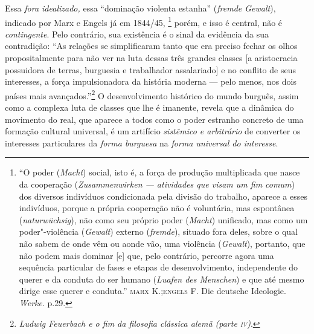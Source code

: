 Essa \emph{fora idealizado,} essa ``dominação violenta estanha''
(\emph{fremde Gewalt}), indicado por Marx e Engels já em 1844/45,
\footnote{``O poder (\emph{Macht}) social, isto é, a força de produção
  multiplicada que nasce da cooperação (\emph{Zusammenwirken ---
  atividades que visam um fim comum}) dos diversos indivíduos
  condicionada pela divisão do trabalho, aparece a esses indivíduos,
  porque a própria cooperação não é voluntária, mas espontânea
  (\emph{naturwüchsig}), não como seu próprio poder (\emph{Macht})
  unificado, mas como um poder"-violência (\emph{Gewalt}) externo
  (\emph{fremde}), situado fora deles, sobre o qual não sabem de onde
  vêm ou aonde vão, uma violência (\emph{Gewalt}), portanto, que não
  podem mais dominar {[}e{]} que, pelo contrário, percorre agora uma
  sequência particular de fases e etapas de desenvolvimento,
  independente do querer e da conduta do ser humano (\emph{Luafen des
  Menschen}) e que até mesmo dirige esse querer e conduta.''
  \textsc{marx} K.;\textsc{engels} F. Die deutsche Ideologie.
  \emph{Werke}. p.29.} porém, e isso é central, não é
\emph{contingente}. Pelo contrário, sua existência é o sinal da
evidência da sua contradição: ``As relações se simplificaram tanto que
era preciso fechar os olhos propositalmente para não ver na luta dessas
três grandes classes {[}a aristocracia possuidora de terras, burguesia e
trabalhador assalariado{]} e no conflito de seus interesses, a força
impulsionadora da história moderna --- pelo menos, nos dois países mais
avançados.''\footnote{\emph{Ludwig Feuerbach e o fim da filosofia
  clássica alemã (parte \textsc{iv})}.} O desenvolvimento histórico do
mundo burguês, assim como a complexa luta de classes que lhe é imanente,
revela que a dinâmica do movimento do real, que aparece a todos como o
poder estranho concreto de uma formação cultural universal, é um
artifício \emph{sistêmico e arbitrário} de converter os interesses
particulares da \emph{forma burguesa} na \emph{forma universal do
interesse}.

